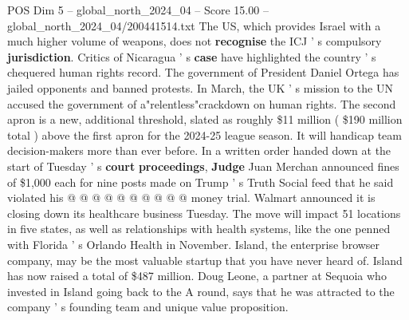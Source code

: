 \begin{textsample}{POS Dim 5 – global\_north\_2024\_04 – Score 15.00 – global\_north\_2024\_04/200441514.txt}
The US, which provides Israel with a much higher volume of weapons, does not \textbf{recognise} the ICJ ' s compulsory \textbf{jurisdiction}.
Critics of Nicaragua ' s \textbf{case} have highlighted the country ' s chequered human rights record.
The government of President Daniel Ortega has jailed opponents and banned protests.
In March, the UK ' s mission to the UN accused the government of a"relentless"crackdown on human rights.
The second apron is a new, additional threshold, slated as roughly \$11 million ( \$190 million total ) above the first apron for the 2024-25 league season.
It will handicap team decision-makers more than ever before.
In a written order handed down at the start of Tuesday ' s \textbf{court} \textbf{proceedings}, \textbf{Judge} Juan Merchan announced fines of \$1,000 each for nine posts made on Trump ' s Truth Social feed that he said violated his @ @ @ @ @ @ @ @ @ @ money trial.
Walmart announced it is closing down its healthcare business Tuesday.
The move will impact 51 locations in five states, as well as relationships with health systems, like the one penned with Florida ' s Orlando Health in November.
Island, the enterprise browser company, may be the most valuable startup that you have never heard of.
Island has now raised a total of \$487 million.
Doug Leone, a partner at Sequoia who invested in Island going back to the A round, says that he was attracted to the company ' s founding team and unique value proposition.

\end{textsample}
